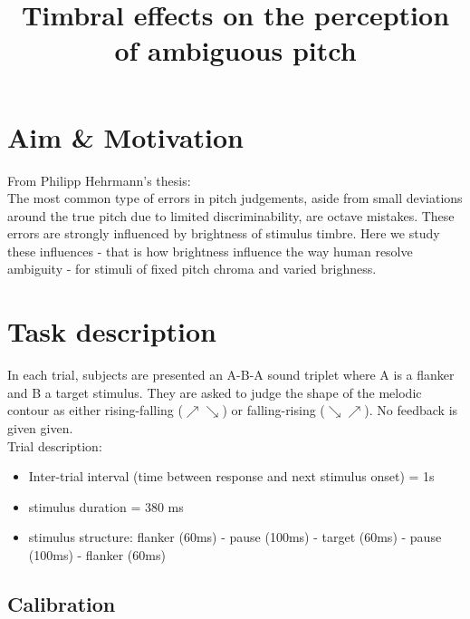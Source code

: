 \documentclass[11pt,a4paper,oneside]{article}
\begin{document}
\renewcommand{\v}[1]{\mathbf{#1}}
\newcommand{\diag}{\mathop{\mathrm{diag}}}



\title{Timbral effects on the perception of ambiguous pitch}
\date{}
\maketitle

\section{Aim \& Motivation}

From Philipp Hehrmann's thesis:\\
The most common type of errors in pitch judgements, aside from small deviations around the true pitch due to limited discriminability, are octave mistakes.
These errors are strongly influenced by brightness of stimulus timbre.
Here we study these influences - that is how brightness influence the way human resolve ambiguity - for stimuli of fixed pitch chroma and varied brighness.

\section{Task description}

In each trial, subjects are presented an A-B-A sound triplet where A is a flanker and B a target stimulus. They  are asked to judge the shape of the melodic contour as either rising-falling ($\nearrow \searrow$) or falling-rising ($\searrow \nearrow$). No feedback is given given.\\

Trial description:
\begin{itemize}
\item Inter-trial interval (time between response and next stimulus onset) = 1s
\item stimulus duration = 380 ms
\item stimulus structure:
flanker (60ms) - pause (100ms) - target (60ms) - pause (100ms) - flanker (60ms)
\end{itemize}

\subsection{Calibration}
\end{document}
